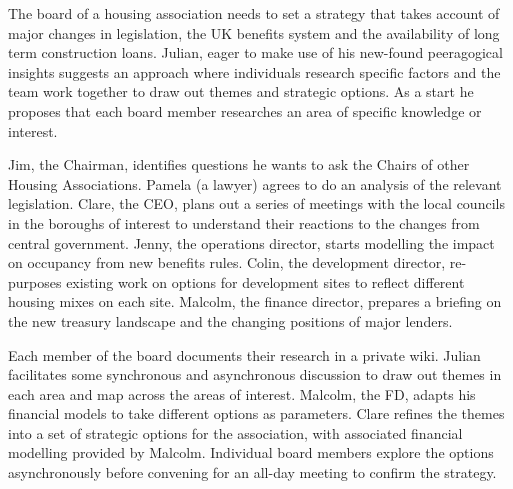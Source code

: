 
The board of a housing association needs to set a strategy that takes
account of major changes in legislation, the UK benefits system and the
availability of long term construction loans. Julian, eager to make use
of his new-found peeragogical insights suggests an approach where
individuals research specific factors and the team work together to draw
out themes and strategic options. As a start he proposes that each board
member researches an area of specific knowledge or interest.

Jim, the Chairman, identifies questions he wants to ask the Chairs of
other Housing Associations. Pamela (a lawyer) agrees to do an analysis
of the relevant legislation. Clare, the CEO, plans out a series of
meetings with the local councils in the boroughs of interest to
understand their reactions to the changes from central government.
Jenny, the operations director, starts modelling the impact on occupancy
from new benefits rules. Colin, the development director, re-purposes
existing work on options for development sites to reflect different
housing mixes on each site. Malcolm, the finance director, prepares a
briefing on the new treasury landscape and the changing positions of
major lenders.

Each member of the board documents their research in a private wiki.
Julian facilitates some synchronous and asynchronous discussion to draw
out themes in each area and map across the areas of interest. Malcolm,
the FD, adapts his financial models to take different options as
parameters. Clare refines the themes into a set of strategic options for
the association, with associated financial modelling provided by
Malcolm. Individual board members explore the options asynchronously
before convening for an all-day meeting to confirm the strategy.
